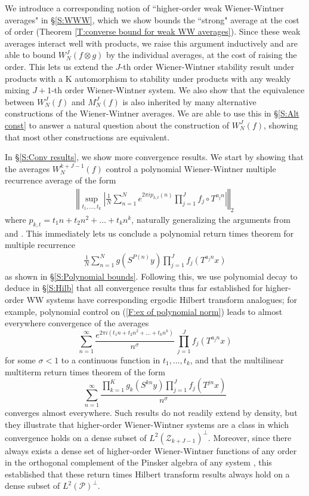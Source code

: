 \documentclass[11pt, oneside]{amsart}   	%
\newcommand{\1}{\mathbbm{1}}
\theoremstyle{definition}
\begin{document}
We introduce a corresponding notion of ``higher-order weak Wiener-Wintner averages" in \S \ref{S:WWW}, which we show bounds the ``strong" average at the cost of order (Theorem \ref{T:converse bound for weak WW averages}). Since these weak averages interact well with products, we raise this argument inductively and are able to bound $W_N^J(f \otimes g)$ by the individual averages, at the cost of raising the order. This lets us extend the $J$-th order Wiener-Wintner stability result under products with a K automorphism \cite{assani2024higherorderwienerwintnersystems} to stability under products with any weakly mixing $J+1$-th order Wiener-Wintner system. We also show that the equivalence between $W_N^J(f)$ and $M_N^J(f)$ is also inherited by many alternative constructions of the Wiener-Wintner averages. We are able to use this in \S \ref{S:Alt const} to answer a natural question about the construction of $W_N^J(f)$, showing that most other constructions are equivalent.

In \S \ref{S:Conv results}, we show more convergence results. We start by showing that the averages $W_N^{k+J-1}(f)$ control a polynomial Wiener-Wintner multiple recurrence average of the form
\begin{align}\label{F:ex of polynomial norm}
\left\Vert \sup_{t_1, \dots, t_k} \left|\frac{1}{N}\sum_{n=1}^N e^{2\pi i p_{k, t}(n)} \prod_{j=1}^J f_j \circ T^{a_j n} \right| \right\Vert_2
\end{align}
where $p_{k, t} = t_1n + t_2n^2 + \dots + t_kn^k$, naturally generalizing the arguments from \cite{assani2024higherorderwienerwintnersystems} and \cite{AssaniMoore}. This immediately lets us conclude a polynomial return times theorem for multiple recurrence
\begin{align*}
\frac{1}{N}\sum_{n=1}^N g(S^{P(n)} y) \prod_{j=1}^J f_{j}(T^{a_j n} x)
\end{align*}
as shown in \S \ref{S:Polynomial bounds}. Following this, we use polynomial decay to deduce in \S\ref{S:Hilb} that all convergence results thus far established for higher-order WW systems have corresponding ergodic Hilbert transform analogues; for example, polynomial control on (\ref{F:ex of polynomial norm}) leads to almost everywhere convergence of the averages
$$\sum_{n=1}^\infty \frac{e^{2\pi i \left(t_1 n + t_2 n^2 + \dots + t_k n^k\right)}}{n^\sigma} \, \prod_{j=1}^{J}f_j(T^{a_j n} x)$$
for some $\sigma < 1$ to a continuous function in $t_1, \dots, t_k$, and that the multilinear multiterm return times theorem of the form 
$$\sum_{n=1}^\infty \frac{\prod_{k=1}^K g_{k} (S^{kn} y) \prod_{j=1}^J f_{j} (T^{jn} x)}{n^\sigma}$$
converges almost everywhere. Such results do not readily extend by density, but they illustrate that higher-order Wiener-Wintner systems are a class in which convergence holds on a dense subset of $L^2(\mathcal{Z}_{k+J-1})^\perp$. Moreover, since there always exists a dense set of higher-order Wiener-Wintner functions of any order in the orthogonal complement of the Pinsker algebra of any system \cite{assani2024higherorderwienerwintnersystems}, this established that these return times Hilbert transform results always hold on a dense subset of $L^2(\mathcal{P})^\perp$.
\end{document}
